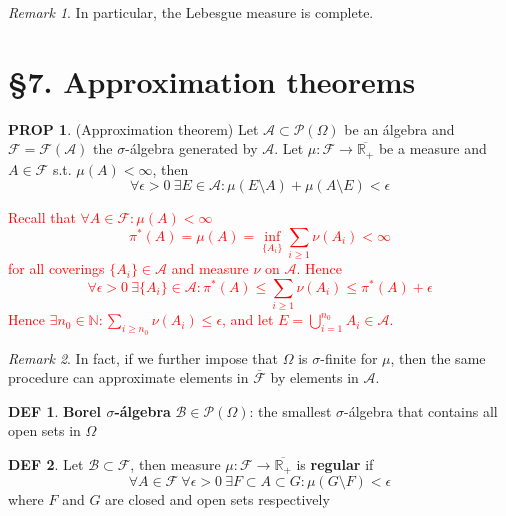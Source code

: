 \documentclass[hidelinks]{article}
\theoremstyle{definition}
\newtheorem*{defin}{DEF}
\theoremstyle{dotless}
\newtheorem{proposition}{PROP}[section]
\theoremstyle{remark}
\newtheorem*{remark}{Remark}
\begin{document}
\begin{remark}
In particular, the Lebesgue measure is complete.
\end{remark}

\bigbreak

\section*{\S7. Approximation theorems}
\setcounter{section}{7}

\begin{proposition} (Approximation theorem)
Let $\mathscr{A}\subset\mathscr{P}(\Omega)$ be an álgebra and $\mathscr{F}=\mathscr{F}(\mathscr{A})$ the $\sigma$-álgebra generated by $\mathscr{A}$. Let $\mu:\mathscr{F}\to\overline{\mathbb{R}_+}$ be a measure and $A\in\mathscr{F}$ s.t. $\mu(A)<\infty$, then
\[\forall\epsilon>0\ \exists E\in\mathscr{A}:\mu(E\setminus A)+\mu(A\setminus E)<\epsilon\]
\end{proposition}
\textcolor{red}{Recall that $\forall A\in\mathscr{F}:\mu(A)<\infty$
\[\pi^*(A)=\mu(A)=\inf_{\{A_i\}}\sum_{i\geq1}\nu(A_i)<\infty\]
for all coverings $\{A_i\}\in\mathscr{A}$ and measure $\nu$ on $\mathscr{A}$. Hence
\[\forall\epsilon>0\ \exists\{A_i\}\in\mathscr{A}:\pi^*(A)\leq\sum_{i\geq1}\nu(A_i)\leq\pi^*(A)+\epsilon\]
Hence $\exists n_0\in\mathbb{N}:\sum\limits_{i\geq n_0}\nu(A_i)\leq\epsilon$, and let $E=\bigcup\limits_{i=1}^{n_0}A_i\in\mathscr{A}$.}

\begin{remark}
In fact, if we further impose that $\Omega$ is $\sigma$-finite for $\mu$, then the same procedure can approximate elements in $\overline{\mathscr{F}}$ by elements in $\mathscr{A}$.
\end{remark}

\begin{defin}
\textbf{Borel $\sigma$-álgebra} $\mathscr{B}\in\mathscr{P}(\Omega)$: the smallest $\sigma$-álgebra that contains all open sets in $\Omega$
\end{defin}

\begin{defin}
Let $\mathscr{B}\subset\mathscr{F}$, then measure $\mu:\mathscr{F}\to\overline{\mathbb{R}_+}$ is \textbf{regular} if
\[\forall A\in\mathscr{F}\ \forall\epsilon>0\ \exists F\subset A\subset G:\mu(G\setminus F)<\epsilon\]
where $F$ and $G$ are closed and open sets respectively
\end{defin}
\end{document}
